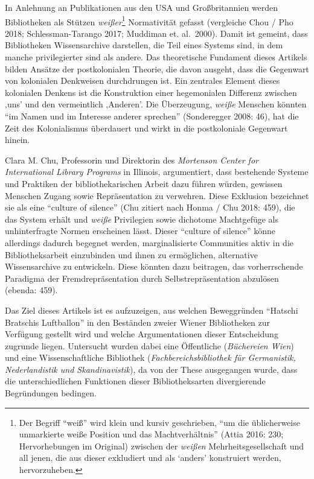 \documentclass[a4paper,
fontsize=11pt,
oneside,
numbers=noperiodatend,
parskip=half-,
bibliography=totoc,
final
]{scrartcl}
\begin{document}
In Anlehnung an Publikationen aus den USA und Großbritannien werden
Bibliotheken als Stützen \emph{weißer}\footnote{Der Begriff \enquote{weiß}
  wird klein und kursiv geschrieben, \enquote{um die üblicherweise unmarkierte
  weiße Position und das Machtverhältnis} (Attia 2016: 230;
  Hervorhebungen im Original) zwischen der \emph{weißen}
  Mehrheitsgesellschaft und all jenen, die aus dieser exkludiert und als
  `anders' konstruiert werden, hervorzuheben.} Normativität gefasst
(vergleiche Chou / Pho 2018; Schlessman-Tarango 2017; Muddiman et.
al.~2000). Damit ist gemeint, dass Bibliotheken Wissensarchive
darstellen, die Teil eines Systems sind, in dem manche privilegierter
sind als andere. Das theoretische Fundament dieses Artikels bilden
Ansätze der postkolonialen Theorie, die davon ausgeht, dass die
Gegenwart von kolonialen Denkweisen durchdrungen ist. Ein zentrales
Element dieses kolonialen Denkens ist die Konstruktion einer
hegemonialen Differenz zwischen ‚uns' und den vermeintlich ‚Anderen'.
Die Überzeugung, \emph{weiße} Menschen könnten \enquote{im Namen und im
Interesse anderer sprechen} (Sonderegger 2008: 46), hat die Zeit des
Kolonialismus überdauert und wirkt in die postkoloniale Gegenwart
hinein.

Clara M. Chu, Professorin und Direktorin des \emph{Mortenson Center for
International Library Programs} in Illinois, argumentiert, dass
bestehende Systeme und Praktiken der bibliothekarischen Arbeit dazu
führen würden, gewissen Menschen Zugang sowie Repräsentation zu
verwehren. Diese Exklusion bezeichnet sie als eine \enquote{culture of
silence} (Chu zitiert nach Honma / Chu 2018: 459), die das System
erhält und \emph{weiße} Privilegien sowie dichotome Machtgefüge als
unhinterfragte Normen erscheinen lässt. Dieser \enquote{culture of silence}
könne allerdings dadurch begegnet werden, marginalisierte Communities
aktiv in die Bibliotheksarbeit einzubinden und ihnen zu ermöglichen,
alternative Wissensarchive zu entwickeln. Diese könnten dazu beitragen,
das vorherrschende Paradigma der Fremdrepräsentation durch
Selbstrepräsentation abzulösen (ebenda: 459).

Das Ziel dieses Artikels ist es aufzuzeigen, aus welchen Beweggründen
\enquote{Hatschi Bratschis Luftballon} in den Beständen zweier Wiener
Bibliotheken zur Verfügung gestellt wird und welche Argumentationen
dieser Entscheidung zugrunde liegen. Untersucht wurden dabei eine
Öffentliche (\emph{Büchereien Wien}) und eine Wissenschaftliche
Bibliothek (\emph{Fachbereichsbibliothek für Germanistik, Nederlandistik
und Skandinavistik}), da von der These ausgegangen wurde, dass die
unterschiedlichen Funktionen dieser Bibliotheksarten divergierende
Begründungen bedingen.
\end{document}
